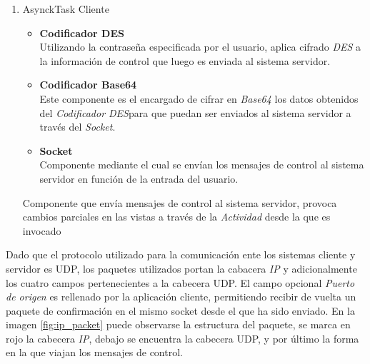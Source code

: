 \documentclass[12pt]{article}
\begin{document}
\begin{enumerate}
\begin{itemize}
                    \end{itemize}
                \item AsynckTask Cliente
                    \begin{itemize}
                        \item \textbf{Codificador DES} \\
                            Utilizando la contraseña especificada por el usuario, aplica cifrado \textit{DES} a la información de control que luego es enviada al sistema servidor.
                        \item \textbf{Codificador Base64} \\
                            Este componente es el encargado de cifrar en \textit{Base64} los datos obtenidos del \textit{Codificador DES}para que puedan ser enviados al sistema servidor a través del \textit{Socket}.
                        \item \textbf{Socket} \\ 
                            Componente mediante el cual se envían los mensajes de control al sistema servidor en función de la entrada del usuario.
                    \end{itemize}
                    Componente que envía mensajes de control al sistema servidor, provoca cambios parciales en las vistas a través de la \textit{Actividad} desde la que es invocado
            \end{enumerate}

            Dado que el protocolo utilizado para la comunicación ente los sistemas cliente y servidor es UDP, los paquetes utilizados portan la cabacera \textit{IP} y adicionalmente los cuatro campos pertenecientes a la cabecera UDP. El campo opcional \textit{Puerto de origen} es rellenado por la aplicación cliente, permitiendo recibir de vuelta un paquete de confirmación en el mismo socket desde el que ha sido enviado. En la imagen \ref{fig:ip_packet} puede observarse la estructura del paquete, se marca en rojo la cabecera \textit{IP}, debajo se encuentra la cabecera UDP, y por último la forma en la que viajan los mensajes de control.
\end{document}
